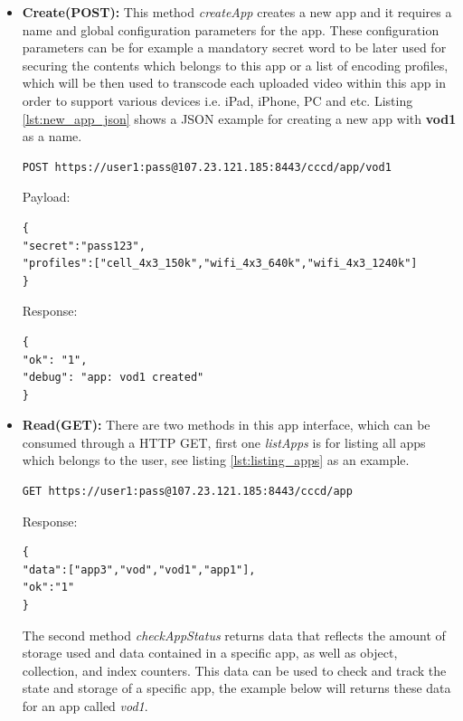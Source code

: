 \begin{itemize}
\item \textbf{Create(POST):} This method \textit{createApp} creates a new app and it requires a name and global configuration parameters for the app. These configuration parameters can be for example a mandatory secret word to be later used for securing the contents which belongs to this app or a list of encoding profiles, which will be then used to transcode each uploaded video within this app in order to support various devices i.e. iPad, iPhone, PC and etc. Listing \ref{lst:new_app_json} shows a \ac{JSON} example for creating a new app with \textbf{vod1} as a name.

\begin{code}
\begin{verbatim}
POST https://user1:pass@107.23.121.185:8443/cccd/app/vod1
\end{verbatim}
Payload:
\begin{verbatim}
{
"secret":"pass123",
"profiles":["cell_4x3_150k","wifi_4x3_640k","wifi_4x3_1240k"]
}
\end{verbatim}
Response:
\begin{verbatim}
{
"ok": "1",
"debug": "app: vod1 created"
}
\end{verbatim}
\caption{Creating a new app}
\label{lst:new_app_json}
\end{code}

\item \textbf{Read(GET):} There are two methods in this app interface, which can be consumed through a \ac{HTTP} GET, first one \textit{listApps} is for listing all apps which belongs to the user, see listing \ref{lst:listing_apps} as an example. 

\begin{code}
\begin{verbatim}
GET https://user1:pass@107.23.121.185:8443/cccd/app
\end{verbatim}
Response:
\begin{verbatim}
{
"data":["app3","vod","vod1","app1"],
"ok":"1"
}
\end{verbatim}
\caption{Listing all apps which belong to a user}
\label{lst:listing_apps}
\end{code}


The second method \textit{checkAppStatus} returns data that reflects the amount of storage used and data contained in a specific app, as well as object, collection, and index counters. This data can be used to check and track the state and storage of a specific app, the example below will returns these data for an app called \textit{vod1}.


\end{itemize}

